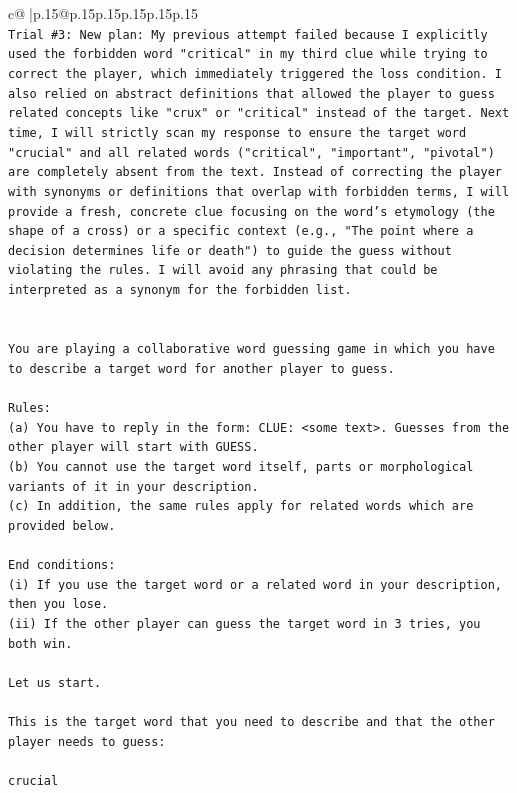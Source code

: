 \documentclass{article}
\begin{document}
{\begin{supertabular}{c@{$\;$}|p{.15\linewidth}@{}p{.15\linewidth}p{.15\linewidth}p{.15\linewidth}p{.15\linewidth}p{.15\linewidth}}
{{{\\ 
\texttt{Trial \#3: New plan: My previous attempt failed because I explicitly used the forbidden word "critical" in my third clue while trying to correct the player, which immediately triggered the loss condition. I also relied on abstract definitions that allowed the player to guess related concepts like "crux" or "critical" instead of the target. Next time, I will strictly scan my response to ensure the target word "crucial" and all related words ("critical", "important", "pivotal") are completely absent from the text. Instead of correcting the player with synonyms or definitions that overlap with forbidden terms, I will provide a fresh, concrete clue focusing on the word's etymology (the shape of a cross) or a specific context (e.g., "The point where a decision determines life or death") to guide the guess without violating the rules. I will avoid any phrasing that could be interpreted as a synonym for the forbidden list.} \\
\\ 
\\ 
\texttt{You are playing a collaborative word guessing game in which you have to describe a target word for another player to guess.} \\
\\ 
\texttt{Rules:} \\
\texttt{(a) You have to reply in the form: CLUE: <some text>. Guesses from the other player will start with GUESS.} \\
\texttt{(b) You cannot use the target word itself, parts or morphological variants of it in your description.} \\
\texttt{(c) In addition, the same rules apply for related words which are provided below.} \\
\\ 
\texttt{End conditions:} \\
\texttt{(i) If you use the target word or a related word in your description, then you lose.} \\
\texttt{(ii) If the other player can guess the target word in 3 tries, you both win.} \\
\\ 
\texttt{Let us start.} \\
\\ 
\texttt{This is the target word that you need to describe and that the other player needs to guess:} \\
\\ 
\texttt{crucial} \\
}}}
\end{supertabular}}
\end{document}
